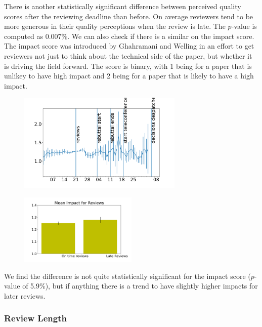 There is another statistically significant difference between perceived
quality scores after the reviewing deadline than before. On average
reviewers tend to be more generous in their quality perceptions when the
review is late. The \(p\)-value is computed as 0.007\%. We can also
check if there is a similar on the impact score. The impact score was
introduced by Ghahramani and Welling in an effort to get reviewers not
just to think about the technical side of the paper, but whether it is
driving the field forward. The score is binary, with 1 being for a paper
that is unlikey to have high impact and 2 being for a paper that is
likely to have a high impact.

\begin{figure}[htb]
\includegraphics[width=0.70\textwidth]{diagrams/neurips/review-impact-time.pdf}


\caption{}
\label{review-impact-time}
\end{figure}

\begin{figure}[htb]
\includegraphics[width=0.50\textwidth]{diagrams/neurips/review-impact-early-late.pdf}


\caption{}
\label{review-impact-early-late}
\end{figure}

We find the difference is not quite statistically significant for the
impact score (\(p\)-value of 5.9\%), but if anything there is a trend to
have slightly higher impacts for later reviews.

\hypertarget{review-length}{%
\subsubsection{Review Length}\label{review-length}}

